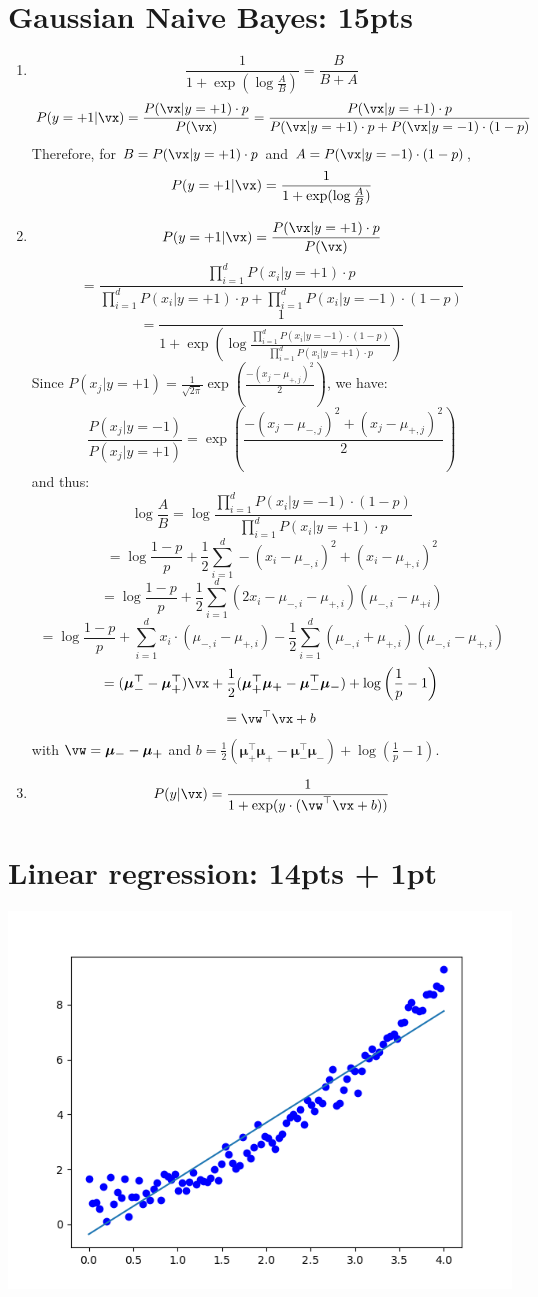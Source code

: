 \documentclass[12pt]{article}
\begin{document}
\section{Gaussian Naive Bayes: 15pts}
\begin{enumerate}
    \item 
    \[\frac{1}{1+\exp(\log\frac{A}{B})} = \frac{B}{B+A}\]
    \[P(y=+1|\vx) = \frac{P(\vx|y=+1) \cdot p}{P(\vx)} = \frac{P(\vx|y=+1) \cdot p}{P(\vx|y=+1) \cdot p + P(\vx|y=-1) \cdot (1-p)}\]
    Therefore, for $B = P(\vx|y=+1) \cdot p$ and $A = P(\vx|y=-1) \cdot (1-p)$, 
    \[P(y=+1|\vx) = \frac{1}{1+\exp(\log\frac{A}{B})}\]
    \item \[P(y=+1|\vx) = \frac{P(\vx|y=+1) \cdot p}{P(\vx)}\] 
    \[= \frac{\displaystyle \prod_{i=1}^{d}P(x_i|y=+1)\cdot p}{\displaystyle \prod_{i=1}^{d}P(x_i|y=+1)\cdot p + \prod_{i=1}^{d}P(x_i|y=-1)\cdot (1-p)}\]
    \[= \frac{1}{1+\exp\left(\log\frac{\displaystyle\prod_{i=1}^{d}P(x_i|y=-1)\cdot (1-p)}{\displaystyle\prod_{i=1}^{d}P(x_i|y=+1)\cdot p}\right)}\]
    Since $P(x_j|y=+1) = \frac{1}{\sqrt{2\pi}}\exp(\frac{-(x_j-\mu_{+,j})^2}{2})$, we have:
    \[\frac{P(x_j|y=-1)}{P(x_j|y=+1)} = \exp\left(\frac{-(x_j-\mu_{-,j})^2+(x_j-\mu_{+,j})^2}{2}\right)\] and thus:
    \[\log\frac{A}{B} = \log\frac{\displaystyle\prod_{i=1}^{d}P(x_i|y=-1)\cdot (1-p)}{\displaystyle\prod_{i=1}^{d}P(x_i|y=+1)\cdot p}\] 
    \[= \log\frac{1-p}{p} + \frac{1}{2}\sum_{i=1}^{d}-(x_i-\mu_{-,i})^2+(x_i-\mu_{+,i})^2\]
    \[= \log\frac{1-p}{p} + \frac{1}{2}\sum_{i=1}^{d}(2x_i-\mu_{-,i}-\mu_{+,i})(\mu_{-,i} - \mu_{+i})\]
    \[= \log\frac{1-p}{p} + \sum_{i=1}^{d}x_i\cdot(\mu_{-,i} - \mu_{+,i}) - \frac{1}{2}\sum_{i=1}^d(\mu_{-,i}+\mu_{+,i})(\mu_{-,i} - \mu_{+,i})\]
    \[= (\boldsymbol{\mu_-^{\top}} - \boldsymbol{\mu_+^{\top}})\vx + \frac{1}{2}(\boldsymbol{\mu_+^{\top}}\boldsymbol{\mu_+} - \boldsymbol{\mu_-^{\top}}\boldsymbol{\mu_-}) + \log\left(\frac{1}{p} - 1 \right)\]
    \[= \vw^{\top}\vx + b\] with $\vw=\boldsymbol{\mu_-} - \boldsymbol{\mu_+}$ and $b = \frac{1}{2}(\boldsymbol{\mu_+^{\top}}\boldsymbol{\mu_+} - \boldsymbol{\mu_-^{\top}}\boldsymbol{\mu_-}) + \log\left(\frac{1}{p} - 1 \right)$.
    \item \[P(y|\vx) = \frac{1}{1 + \exp(y\cdot(\vw^{\top}\vx+b))}\]
\end{enumerate}
 
\section{Linear regression: 14pts + 1pt}
\centering
\includegraphics[scale = 0.9]{linear_normal.png}
\end{document}
